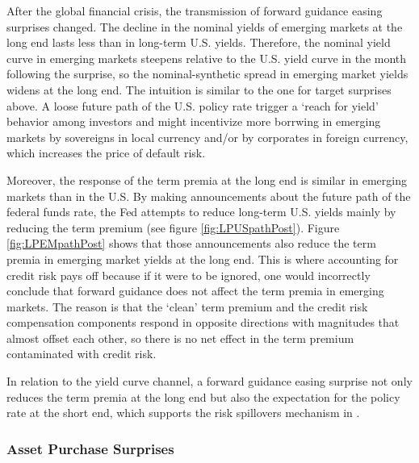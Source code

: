 {After the global financial crisis, the transmission of forward guidance easing surprises changed. 
The decline in the nominal yields of emerging markets at the long end lasts less than in long-term U.S. yields. 
Therefore, the nominal yield curve in emerging markets steepens relative to the U.S. yield curve in the month following the surprise, %
so the nominal-synthetic spread in emerging market yields widens at the long end.
The intuition is similar to the one for target surprises above. A loose future path of the U.S. policy rate trigger a `reach for yield' behavior among investors and might incentivize more borrwing in emerging markets by sovereigns in local currency and/or by corporates in foreign currency, which increases the price of default risk.

Moreover, the response of the term premia at the long end is similar in emerging markets than in the U.S.
By making announcements about the future path of the federal funds rate, the Fed attempts to reduce long-term U.S. yields mainly by reducing the term premium (see figure \ref{fig:LPUSpathPost}). Figure \ref{fig:LPEMpathPost} shows that those announcements also reduce the term premia in emerging market yields at the long end.
This is where accounting for credit risk pays off because if it were to be ignored, one would incorrectly conclude that forward guidance does not affect the term premia in emerging markets. The reason is that the `clean' term premium and the credit risk compensation components respond in opposite directions with magnitudes that almost offset each other, so there is no net effect in the term premium contaminated with credit risk.

In relation to the yield curve channel, a forward guidance easing surprise not only reduces the term premia at the long end 
but also the expectation for the policy rate at the short end, which
supports the risk spillovers mechanism in \cite{Kalemli-Ozcan:2019}.


\subsubsection{Asset Purchase Surprises}
\iftoggle{toclinks}{\gototoc}{} %

}
